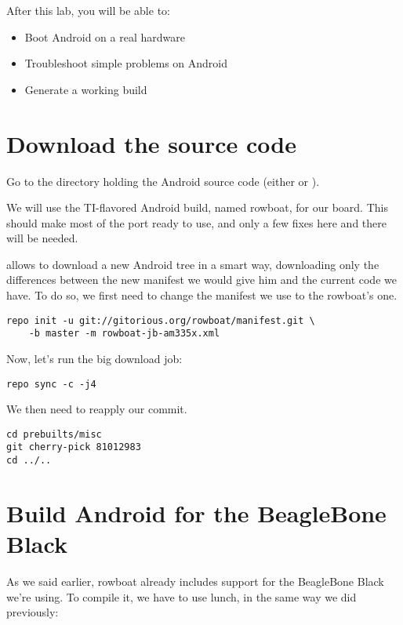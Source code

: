 
After this lab, you will be able to:
\begin{itemize}
  \item Boot Android on a real hardware
  \item Troubleshoot simple problems on Android
  \item Generate a working build
\end{itemize}

\section{Download the source code}

Go to the directory holding the Android source code (either
 or ).

We will use the TI-flavored Android build, named rowboat, for our
board. This should make most of the port ready to use, and only a few
fixes here and there will be needed.

 allows to download a new Android tree in a smart way,
downloading only the differences between the new manifest we would
give him and the current code we have. To do so, we first need to
change the manifest we use to the rowboat's one.

\begin{verbatim}
repo init -u git://gitorious.org/rowboat/manifest.git \
    -b master -m rowboat-jb-am335x.xml
\end{verbatim}

Now, let's run the big download job:
\begin{verbatim}
repo sync -c -j4
\end{verbatim}

We then need to reapply our  commit.
\begin{verbatim}
cd prebuilts/misc
git cherry-pick 81012983
cd ../..
\end{verbatim}

\section{Build Android for the BeagleBone Black}

As we said earlier, rowboat already includes support for the
BeagleBone Black we're using. To compile it, we have to use lunch, in
the same way we did previously:

